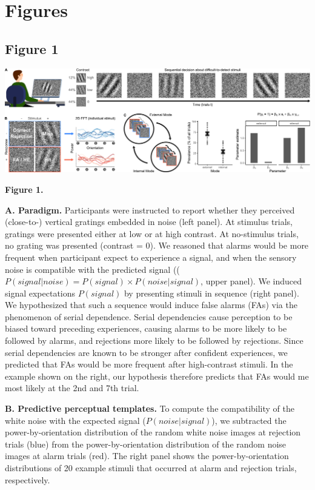 \documentclass[
]{article}
\begin{document}
\newpage

\hypertarget{figures}{%
\section{Figures}\label{figures}}

\hypertarget{figure-1}{%
\subsection{Figure 1}\label{figure-1}}

\includegraphics{./predictive_templates_files/figure-latex/Figure_1.png}

\textbf{Figure 1.}

\textbf{A. Paradigm.} Participants were instructed to report whether
they perceived (close-to-) vertical gratings embedded in noise (left
panel). At stimulus trials, gratings were presented either at low or at
high contrast. At no-stimulus trials, no grating was presented (contrast
= 0). We reasoned that alarms would be more frequent when participant
expect to experience a signal, and when the sensory noise is compatible
with the predicted signal
((\(P(signal|noise) = P(signal) \times P(noise|signal)\), upper panel).
We induced signal expectations \(P(signal)\) by presenting stimuli in
sequence (right panel). We hypothesized that such a sequence would
induce false alarms (FAs) via the phenomenon of serial dependence.
Serial dependencies cause perception to be biased toward preceding
experiences, causing alarms to be more likely to be followed by alarms,
and rejections more likely to be followed by rejections. Since serial
dependencies are known to be stronger after confident experiences, we
predicted that FAs would be more frequent after high-contrast stimuli.
In the example shown on the right, our hypothesis therefore predicts
that FAs would me most likely at the 2nd and 7th trial.

\textbf{B. Predictive perceptual templates.} To compute the
compatibility of the white noise with the expected signal
(\(P(noise|signal)\)), we subtracted the power-by-orientation
distribution of the random white noise images at rejection trials (blue)
from the power-by-orientation distribution of the random noise images at
alarm trials (red). The right panel shows the power-by-orientation
distributions of 20 example stimuli that occurred at alarm and rejection
trials, respectively.
\end{document}
